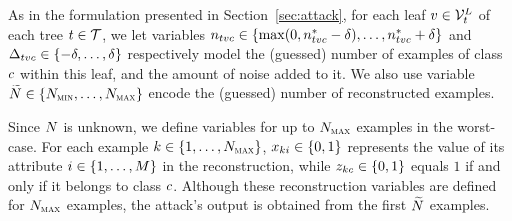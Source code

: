 As in the formulation presented in Section~\ref{sec:attack}, for each leaf $\node \in \leaves[\tree]$ of each tree $t \in \mathcal{T}$, we let variables $\nodesupport[\tree,\node,\class] \in \{\max(0,\nodesupport[\tree,\node,\class]^*-\delta), \dots, \nodesupport[\tree,\node,\class]^* +\delta \}$ and $\Delta_{tvc } \in \{ -\delta, \dots, \delta \}$ respectively model the (guessed) number of examples of class $c$ within this leaf, and the amount of noise added to it.
We also use variable $\smash{\widetilde{N}}\in\{N_{\textsc{min}},\dots, N_{\textsc{max}}\}$ encode the (guessed) number of reconstructed examples.

Since $N$ is unknown, we define variables for up to $N_{\textsc{max}}$ examples in the worst-case. For each example $k \in \{1, \dots, N_{\textsc{max}}\}$, $\varx[\example,\feature] \in \{0,1\}$ represents the value of its attribute $i \in \{1, \dots, M\}$ in the reconstruction, while $\varz[\example,\class] \in \{0,1\}$ equals $1$ if and only if it belongs to class $c$. Although these reconstruction variables are defined for $N_{\textsc{max}}$ examples, the attack's output is obtained from the first $\widetilde{N}$ examples.

